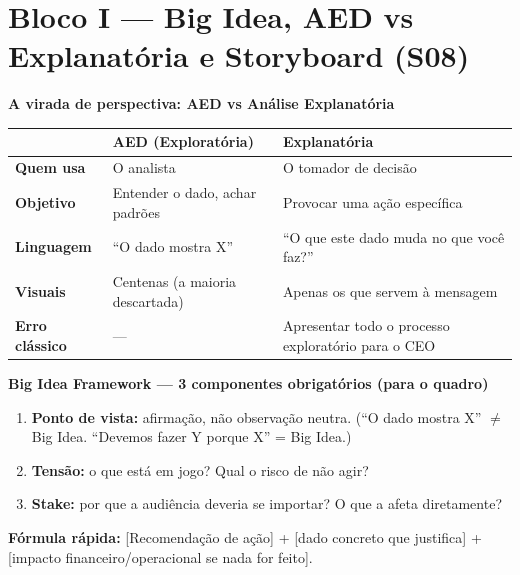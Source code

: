 \section{Bloco I — Big Idea, AED vs Explanatória e Storyboard (S08)}

\begin{SolvedBox}
\textbf{A virada de perspectiva: AED vs Análise Explanatória}

\begin{tabular}{|l|p{5.5cm}|p{5.5cm}|}
\hline
 & \textbf{AED (Exploratória)} & \textbf{Explanatória} \\
\hline
\textbf{Quem usa} & O analista & O tomador de decisão \\
\textbf{Objetivo} & Entender o dado, achar padrões & Provocar uma ação específica \\
\textbf{Linguagem} & ``O dado mostra X'' & ``O que este dado muda no que você faz?'' \\
\textbf{Visuais} & Centenas (a maioria descartada) & Apenas os que servem à mensagem \\
\textbf{Erro clássico} & — & Apresentar todo o processo exploratório para o CEO \\
\hline
\end{tabular}
\end{SolvedBox}

\begin{BoardBox}
\textbf{Big Idea Framework — 3 componentes obrigatórios (para o quadro)}

\begin{enumerate}
  \item \textbf{Ponto de vista:} afirmação, não observação neutra.
  (``O dado mostra X'' $\neq$ Big Idea. ``Devemos fazer Y porque X'' = Big Idea.)
  \item \textbf{Tensão:} o que está em jogo? Qual o risco de não agir?
  \item \textbf{Stake:} por que a audiência deveria se importar? O que a afeta diretamente?
\end{enumerate}

\textbf{Fórmula rápida:} [Recomendação de ação] + [dado concreto que justifica] + [impacto financeiro/operacional se nada for feito].
\end{BoardBox}

